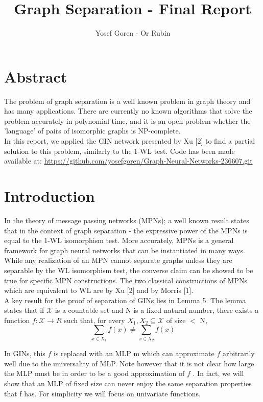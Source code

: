 \documentclass{article}
\begin{document}
\author{Yosef Goren - Or Rubin}
\title{Graph Separation - Final Report}
\maketitle
\part*{Abstract}
The problem of graph separation is a well known problem in graph theory and has many applications.
There are currently no known algorithms that solve the problem accurately in polynomial time, and it is an open
problem whether the 'language' of pairs of isomorphic graphs is NP-complete.\\
In this report, we applied the GIN network presented by Xu [2] to find a partial solution to this problem, 
similarly to the 1-WL test.
Code has been made available at: \url{https://github.com/yosefgoren/Graph-Neural-Networks-236607.git}


\part*{Introduction}
In the theory of message passing networks (MPNs); a well known result states 
that in the context of graph separation - the expressive power of the MPNs is equal to the 1-WL isomorphism test.
More accurately, MPNs is a general framework for graph neural networks that can be
instantiated in many ways. While any realization of an MPN cannot separate
graphs unless they are separable by the WL isomorphism test, the converse
claim can be showed to be true for specific MPN constructions. The two classical
constructions of MPNs which are equivalent to WL are by Xu [2] and by
Morris [1].\\

A key result for the proof of separation of GINs lies in Lemma 5. The lemma
states that if $\mathcal{X}$ is a countable set and N is a fixed natural number, there
exists a function $f : \mathcal{X} \rightarrow R$ such that, for every $X_1, X_2 \subseteq \mathcal{X}$
of size $<$ N,
\[
    \sum_{x\in X_1}f(x) \neq \sum_{x\in X_2}f(x)
\]

In GINs, this $f$ is replaced with an MLP m which can approximate $f$
arbitrarily well due to the universality of MLP. Note however that it is
not clear how large the MLP must be in order to be a good approximation
of $f$ . In fact, we will show that an MLP of fixed size can never enjoy the
same separation properties that f has. For simplicity we will focus on
univariate functions.
\end{document}
